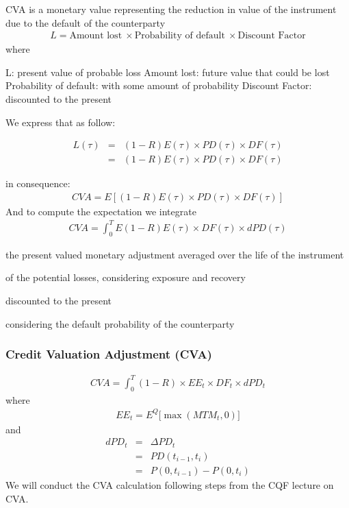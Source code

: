 \documentclass[11pt]{article}
\numberwithin{equation}{subsection}
\begin{document}
CVA is a monetary value representing the reduction in value of the instrument due to the default of the counterparty
\begin{eqnarray}
L = \text{Amount lost} \ \times \text{Probability of default} \ \times \text{Discount Factor}
\end{eqnarray}
where 

L: present value of probable loss
Amount lost: future value that could be lost
Probability of default:  with some amount of probability
Discount Factor: discounted to the present

We express that as follow:

\begin{eqnarray}
L(\tau)&=&(1-R)E(\tau) \times PD(\tau) \times DF(\tau)\\
&=&(1-R)E(\tau) \times PD(\tau) \times DF(\tau)
\end{eqnarray}
	
in consequence:
\begin{eqnarray}
CVA = E[(1-R)E(\tau) \times PD(\tau) \times DF(\tau)]
\end{eqnarray}
And to compute the expectation we integrate
\begin{eqnarray}
CVA = \int_{0}^{T} E(1-R)E(\tau) \times DF(\tau) \times dPD(\tau)
\end{eqnarray}


the present valued monetary adjustment
averaged over the life of the instrument

of the potential losses, considering exposure and recovery

discounted to the present 

considering the default probability of the counterparty

\subsubsection{Credit Valuation Adjustment (CVA)}

\begin{eqnarray}
CVA = \int_{0}^{T} (1-R) \times EE_{t} \times DF_{t}  \times  dPD_{t}
\end{eqnarray}
where 
\begin{eqnarray}
EE_{t} = E^{Q} \big[\max(MTM_{t},0)\big]
\end{eqnarray}
and 
\begin{eqnarray}
dPD_{t}&=&\Delta PD_{t}\\
&=&PD(t_{i-1}, t_{i})\\
&=&P(0, t_{i-1}) - P(0, t_{i})
\end{eqnarray}
We will conduct the CVA calculation following steps from the CQF lecture on CVA.
\end{document}
